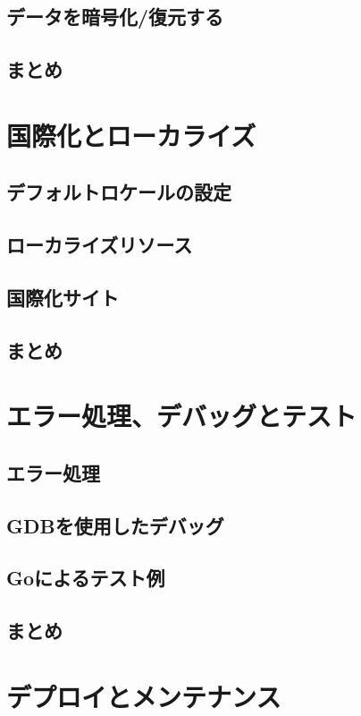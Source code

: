 \subsection{データを暗号化/復元する}
\subsection{まとめ}

\section{国際化とローカライズ}

\subsection{デフォルトロケールの設定}

\subsection{ローカライズリソース}

\subsection{国際化サイト}

\subsection{まとめ}


\section{エラー処理、デバッグとテスト}

\subsection{エラー処理}

\subsection{GDBを使用したデバッグ}

\subsection{Goによるテスト例}

\subsection{まとめ}


\section{デプロイとメンテナンス}

